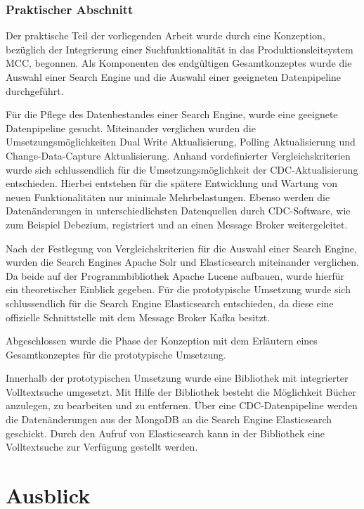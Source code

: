\subsubsection{Praktischer Abschnitt}

Der praktische Teil der vorliegenden Arbeit wurde durch eine Konzeption, bezüglich der Integrierung einer Suchfunktionalität in das Produktionsleitsystem MCC, begonnen. Als Komponenten des endgültigen Gesamtkonzeptes wurde die Auswahl einer Search Engine und die Auswahl einer geeigneten Datenpipeline durchgeführt.

Für die Pflege des Datenbestandes einer Search Engine, wurde eine geeignete Datenpipeline gesucht. Miteinander verglichen wurden die Umsetzungsmöglichkeiten \glqq Dual Write Aktualisierung\grqq{}, \glqq Polling Aktualisierung\grqq{} und \glqq Change-Data-Capture Aktualisierung\grqq{}. Anhand vordefinierter Vergleichskriterien wurde sich schlussendlich für die Umsetzungsmöglichkeit der CDC-Aktualisierung entschieden. Hierbei entstehen für die spätere Entwicklung und Wartung von neuen Funktionalitäten nur minimale Mehrbelastungen. Ebenso werden die Datenänderungen in unterschiedlichsten Datenquellen durch CDC-Software, wie zum Beispiel \glqq Debezium\grqq{}, registriert und an einen Message Broker weitergeleitet.

Nach der Festlegung von Vergleichskriterien für die Auswahl einer Search Engine, wurden die Search Engines \glqq Apache Solr\grqq{} und \glqq Elasticsearch\grqq{} miteinander verglichen. Da beide auf der Programmbibliothek \glqq Apache Lucene\grqq{} aufbauen, wurde hierfür ein theoretischer Einblick gegeben. Für die prototypische Umsetzung wurde sich schlussendlich für die Search Engine Elasticsearch entschieden, da diese eine offizielle Schnittstelle mit dem Message Broker Kafka besitzt.

Abgeschlossen wurde die Phase der Konzeption mit dem Erläutern eines Gesamtkonzeptes für die prototypische Umsetzung.

Innerhalb der prototypischen Umsetzung wurde eine Bibliothek mit integrierter Volltextsuche umgesetzt. Mit Hilfe der Bibliothek besteht die Möglichkeit Bücher anzulegen, zu bearbeiten und zu entfernen. Über eine CDC-Datenpipeline werden die Datenänderungen aus der MongoDB an die Search Engine Elasticsearch geschickt. Durch den Aufruf von Elasticsearch kann in der Bibliothek eine Volltextsuche zur Verfügung gestellt werden.

\section{Ausblick\label{sec6.2:Unterpunkt-2}}


